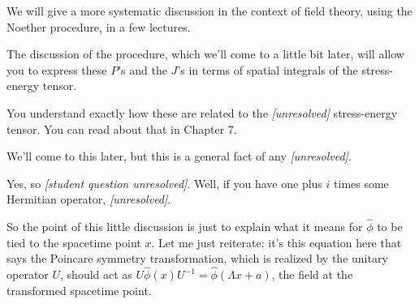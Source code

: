 We will give a more systematic discussion in the context of field theory,
using the Noether procedure, in a few lectures.


The discussion of the procedure, which we'll come to a little bit later, will
allow you to express these $P$'s and the $J$'s in terms of spatial integrals
of the stress-energy tensor.

You understand exactly how these are related to the \textit{[unresolved]}
stress-energy tensor. You can read about that in Chapter 7.

We'll come to this later, but this is a general fact of any
\textit{[unresolved]}.

Yes, so \textit{[student question unresolved]}. Well, if you have one plus
$i$ times some Hermitian operator, \textit{[unresolved]}.


So the point of this little discussion is just to explain what it means for
$\hat\phi$ to be tied to the spacetime point $x$. Let me just reiterate: it's
this equation here that says the Poincare symmetry
transformation, which is realized by the unitary operator $U$, should act as
$U\hat\phi(x)U^{-1}=\hat\phi(\Lambda x+a)$, the field at the transformed
spacetime point.

